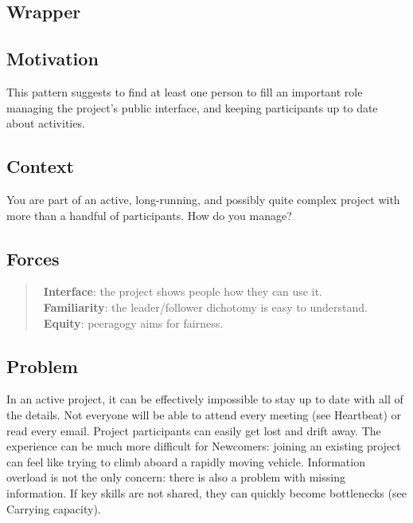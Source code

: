 \hypertarget{wrapper}{%
\subsection{Wrapper}\label{wrapper}}

\hypertarget{motivation}{%
\subsection{Motivation}\label{motivation}}

This pattern suggests to find at least one person to fill an important
role managing the project's public interface, and keeping participants
up to date about activities.

\hypertarget{context}{%
\subsection{Context}\label{context}}

You are part of an active, long-running, and possibly quite complex
project with more than a handful of participants. How do you manage?

\hypertarget{forces}{%
\subsection{Forces}\label{forces}}

\begin{quote}
\Sinterface\ \textbf{Interface}: the project shows people how they can use it.\\
\Sfamiliar\ \textbf{Familiarity}: the leader/follower dichotomy is easy to understand.\\
\Sequity\ \textbf{Equity}: peeragogy aims for fairness.
\end{quote}

\hypertarget{problem}{%
\subsection{Problem}\label{problem}}

In an active project, it can be effectively impossible to stay up to
date with all of the details. Not everyone will be able to attend every
meeting (see {{Heartbeat}}) or read every email. Project participants
can easily get lost and drift away. The experience can be much more
difficult for {{Newcomers}}: joining an existing project can feel like
trying to climb aboard a rapidly moving vehicle. Information overload is
not the only concern: there is also a problem with missing information.
If key skills are not shared, they can quickly become bottlenecks (see
{{Carrying capacity}}).

